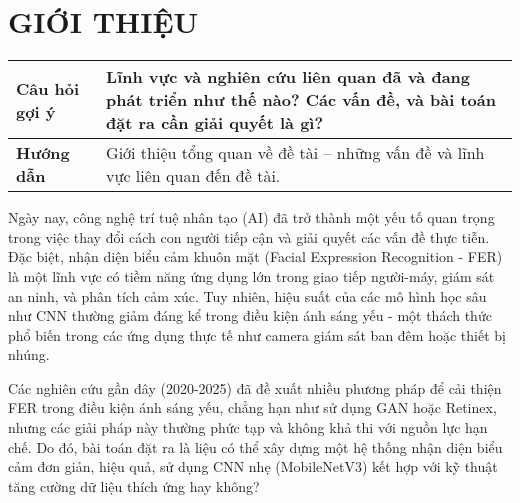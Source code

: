 \section*{GIỚI THIỆU}

\begin{tabular}{|p{4cm}|p{11cm}|}
\hline
\textbf{Câu hỏi gợi ý} & Lĩnh vực và nghiên cứu liên quan đã và đang phát triển như thế nào? Các vấn đề, và bài toán đặt ra cần giải quyết là gì? \\
\hline
\textbf{Hướng dẫn} & Giới thiệu tổng quan về đề tài – những vấn đề và lĩnh vực liên quan đến đề tài. \\
\hline
\end{tabular}

\medskip

Ngày nay, công nghệ trí tuệ nhân tạo (AI) đã trở thành một yếu tố quan trọng trong việc thay đổi cách con người tiếp cận và giải quyết các vấn đề thực tiễn. Đặc biệt, nhận diện biểu cảm khuôn mặt (Facial Expression Recognition - FER) là một lĩnh vực có tiềm năng ứng dụng lớn trong giao tiếp người-máy, giám sát an ninh, và phân tích cảm xúc. Tuy nhiên, hiệu suất của các mô hình học sâu như CNN thường giảm đáng kể trong điều kiện ánh sáng yếu - một thách thức phổ biến trong các ứng dụng thực tế như camera giám sát ban đêm hoặc thiết bị nhúng.  

Các nghiên cứu gần đây (2020-2025) đã đề xuất nhiều phương pháp để cải thiện FER trong điều kiện ánh sáng yếu, chẳng hạn như sử dụng GAN hoặc Retinex, nhưng các giải pháp này thường phức tạp và không khả thi với nguồn lực hạn chế. Do đó, bài toán đặt ra là liệu có thể xây dựng một hệ thống nhận diện biểu cảm đơn giản, hiệu quả, sử dụng CNN nhẹ (MobileNetV3) kết hợp với kỹ thuật tăng cường dữ liệu thích ứng hay không?